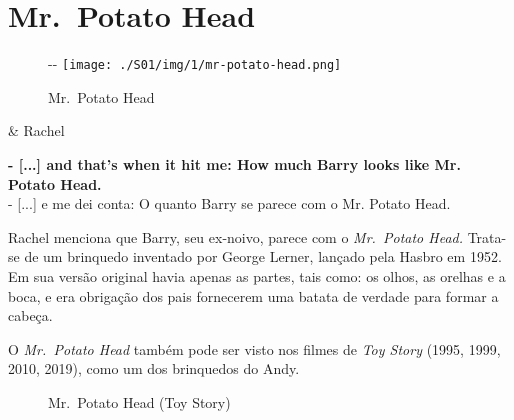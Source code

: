 \hypertarget{mr.-potato-head}{%
\section{Mr.~Potato Head}\label{mr.-potato-head}}

\begin{figure}[!ht]
  \begin{adjustwidth}{-\oddsidemargin-1in}{-\rightmargin}
    \centering
    \texttt{[image: ./S01/img/1/mr-potato-head.png]}
    \caption{Mr. Potato Head\label{fig:mr-potato-head}}
  \end{adjustwidth}
\end{figure}

\begin{tcolorbox}[enhanced,center upper,
    drop fuzzy shadow southeast, boxrule=0.3pt,
    lower separated=false,
    colframe=black!30!dialogoBorder,colback=white]
\begin{minipage}[c]{0.14\linewidth}
   & \centering \scriptsize{Rachel}
\end{minipage}
\hspace{.1mm}
\begin{minipage}[c]{0.8\linewidth}
  \textbf{- [...] and that's when it hit me: How much Barry looks like Mr. Potato Head.}\\
  - [...] e me dei conta: O quanto Barry se parece com o Mr. Potato Head.
\end{minipage}
\end{tcolorbox}

Rachel menciona que Barry, seu ex-noivo, parece com o \emph{Mr.~Potato
Head.} Trata-se de um brinquedo inventado por George Lerner, lançado
pela Hasbro em 1952. Em sua versão original havia apenas as partes, tais
como: os olhos, as orelhas e a boca, e era obrigação dos pais fornecerem
uma batata de verdade para formar a cabeça.

O \emph{Mr.~Potato Head} também pode ser visto nos filmes de \emph{Toy
Story} (1995, 1999, 2010, 2019), como um dos brinquedos do Andy.

\begin{figure}
  \centering
    \caption{Mr. Potato Head (Toy Story)\label{fig:mr-potato-head-toy-story}}
\end{figure}

